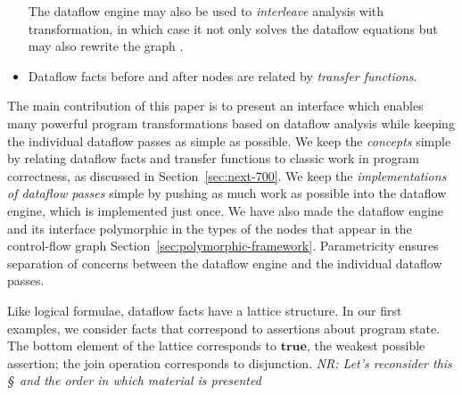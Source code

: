 \documentclass[blockstyle,preprint,nocopyrightspace]{sigplanconf}
\let\cite\citep
\newcommand\true{\ensuremath{\mathbf{true}}}
\newcommand{\authornote}[1]{{\em #1}}
\newcommand{\norman}[1]{\authornote{NR: #1}}
\let\remark\norman
\newcommand\secref[1]{Section~\ref{sec:#1}}
\begin{document}
\begin{itemize}
The dataflow engine may also be used to \emph{interleave} analysis
with transformation, in which case
it not only solves the dataflow equations but may also rewrite the
graph  \cite{lerner-grove-chambers:2002}. 

\item

Dataflow facts before and after nodes are related by \emph{transfer
functions}.


\end{itemize}
The main contribution of this paper is to present an interface which
enables many powerful program transformations based on dataflow
analysis while keeping the individual dataflow passes as simple as
possible.
We keep the \emph{concepts} simple by relating dataflow facts and
transfer functions to classic work in program correctness, as
discussed in \secref{next-700}.
We keep the \emph{implementations of dataflow passes} simple by pushing
as much work as
possible into the dataflow engine, which is implemented just once.
We have also made the dataflow engine and its interface polymorphic in
the types of 
the nodes that appear in the control-flow graph \secref{polymorphic-framework}.
Parametricity ensures separation of concerns between the dataflow
engine and the individual dataflow passes.




Like logical formulae, dataflow facts have a lattice structure.
In our first examples, we consider facts that correspond to assertions
about program state.
The bottom element of the lattice corresponds to \true, the weakest
possible assertion;
the join operation corresponds to disjunction.
\remark{Let's reconsider this \S\ and the order in which material is presented}
\end{document}
